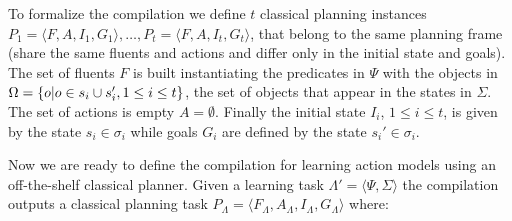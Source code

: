 \documentclass[letterpaper]{article} %
\newcommand{\tup}[1]{{\langle #1 \rangle}}
\begin{document}
To formalize the compilation we define $t$ classical planning instances $P_1=\tup{F,A,I_1,G_1},\ldots,P_t=\tup{F,A,I_t,G_t}$, that belong to the same planning frame (share the same fluents and actions and differ only in the initial state and goals). The set of fluents $F$ is built instantiating the predicates in $\Psi$ with the objects in $\Omega=\{o|o\in s_i\cup s_i', {\small 1\leq i\leq t}\}$, the set of objects that appear in the states in $\Sigma$. The set of actions is empty $A=\emptyset$. Finally the initial state $I_i$, {\small $1\leq i\leq t$}, is given by the state $s_i\in \sigma_i$ while goals $G_i$ are defined by the state $s_i'\in \sigma_i$. 

Now we are ready to define the compilation for learning action models using an off-the-shelf classical planner. Given a learning task $\Lambda'=\tup{\Psi,\Sigma}$ the compilation outputs a classical planning task $P_{\Lambda}=\tup{F_{\Lambda},A_{\Lambda},I_{\Lambda},G_{\Lambda}}$ where:
\end{document}
